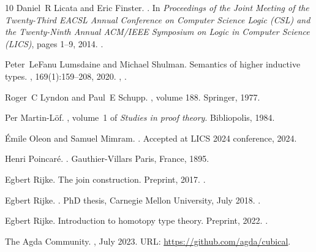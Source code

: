 \documentclass[10pt,a4paper]{amsart}
\theoremstyle{definition}
\begin{document}
\begin{thebibliography}{10}
Daniel~R Licata and Eric Finster.
.
\newblock In {\em Proceedings of the Joint Meeting of the Twenty-Third EACSL
  Annual Conference on Computer Science Logic (CSL) and the Twenty-Ninth Annual
  ACM/IEEE Symposium on Logic in Computer Science (LICS)}, pages 1--9, 2014.
\newblock \href {https://doi.org/10.1145/2603088.2603153}
  {}.

Peter~LeFanu Lumsdaine and Michael Shulman.
\newblock Semantics of higher inductive types.
, 169(1):159--208, 2020.
\newblock \href {https://arxiv.org/abs/1705.07088} {},
  \href {https://doi.org/10.1017/S030500411900015X}
  {}.

Roger~C Lyndon and Paul~E Schupp.
, volume 188.
\newblock Springer, 1977.

Per Martin-L{\"o}f.
, volume~1 of {\em Studies in proof
  theory}.
\newblock Bibliopolis, 1984.

\'Emile Oleon and Samuel Mimram.
.
\newblock Accepted at LICS 2024 conference, 2024.

Henri Poincar{\'e}.
.
\newblock Gauthier-Villars Paris, France, 1895.

Egbert Rijke.
\newblock The join construction.
\newblock Preprint, 2017.
\newblock \href {https://arxiv.org/abs/1701.07538} {}.

Egbert Rijke.
.
\newblock PhD thesis, Carnegie Mellon University, July 2018.
\newblock \href {https://arxiv.org/abs/1906.09435} {}.

Egbert Rijke.
\newblock Introduction to homotopy type theory.
\newblock Preprint, 2022.
\newblock \href {https://arxiv.org/abs/2212.11082} {}.

{The Agda Community}.
, July 2023.
\newblock URL: \url{https://github.com/agda/cubical}.


\end{thebibliography}
\end{document}
